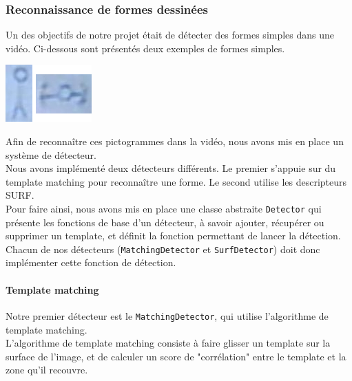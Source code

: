 \subsubsection{Reconnaissance de formes dessinées}

Un des objectifs de notre projet était de détecter des formes simples dans une vidéo. Ci-dessous sont présentés deux exemples de formes simples.\\

\begin{center}
\includegraphics[scale=1]{images/templates.png}
\end{center}

Afin de reconnaître ces pictogrammes dans la vidéo, nous avons mis en place un système de détecteur.\\

Nous avons implémenté deux détecteurs différents. Le premier s'appuie sur du template matching pour reconnaître une forme. Le second utilise les descripteurs SURF.\\

Pour faire ainsi, nous avons mis en place une classe abstraite \texttt{Detector} qui présente les fonctions de base d'un détecteur, à savoir ajouter, récupérer ou supprimer un template, et définit la fonction permettant de lancer la détection.
Chacun de nos détecteurs (\texttt{MatchingDetector} et \texttt{SurfDetector}) doit donc implémenter cette fonction de détection.

\paragraph{Template matching\vspace{0.5cm}\\}

Notre premier détecteur est le \texttt{MatchingDetector}, qui utilise l'algorithme de template matching.\\

L'algorithme de template matching consiste à faire glisser un template sur la surface de l'image, et de calculer un score de "corrélation" entre le template et la zone qu'il recouvre.\\

